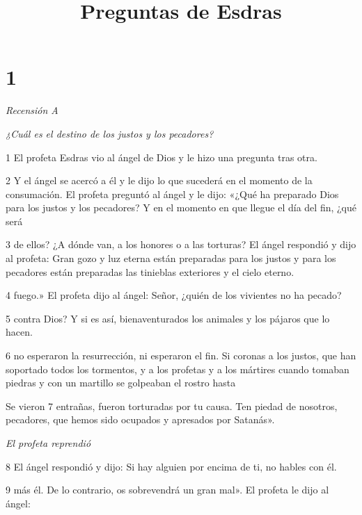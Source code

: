 

\title{Preguntas de Esdras}

\chapter{1}

\par \textit{Recensión A}

\par \textit{¿Cuál es el destino de los justos y los pecadores?}

\par 1 El profeta Esdras vio al ángel de Dios y le hizo una pregunta tras otra.

\par 2 Y el ángel se acercó a él y le dijo lo que sucederá en el momento de la consumación. El profeta preguntó al ángel y le dijo: «¿Qué ha preparado Dios para los justos y los pecadores? Y en el momento en que llegue el día del fin, ¿qué será

\par 3 de ellos? ¿A dónde van, a los honores o a las torturas? El ángel respondió y dijo al profeta: Gran gozo y luz eterna están preparadas para los justos y para los pecadores están preparadas las tinieblas exteriores y el cielo eterno.

\par 4 fuego.» El profeta dijo al ángel: Señor, ¿quién de los vivientes no ha pecado?

\par 5 contra Dios? Y si es así, bienaventurados los animales y los pájaros que lo hacen.

\par 6 no esperaron la resurrección, ni esperaron el fin. Si coronas a los justos, que han soportado todos los tormentos, y a los profetas y a los mártires cuando tomaban piedras y con un martillo se golpeaban el rostro hasta

\par Se vieron 7 entrañas, fueron torturadas por tu causa. Ten piedad de nosotros, pecadores, que hemos sido ocupados y apresados ​​por Satanás».

\par \textit{El profeta reprendió}

\par 8 El ángel respondió y dijo: Si hay alguien por encima de ti, no hables con él.

\par 9 más él. De lo contrario, os sobrevendrá un gran mal». El profeta le dijo al ángel:

